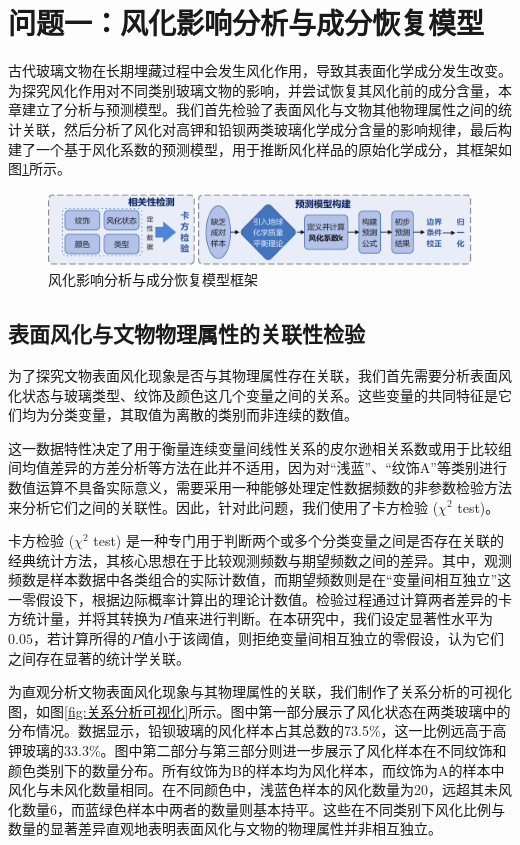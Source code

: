 \section{问题一：风化影响分析与成分恢复模型}

古代玻璃文物在长期埋藏过程中会发生风化作用，导致其表面化学成分发生改变。为探究风化作用对不同类别玻璃文物的影响，并尝试恢复其风化前的成分含量，本章建立了分析与预测模型。我们首先检验了表面风化与文物其他物理属性之间的统计关联，然后分析了风化对高钾和铅钡两类玻璃化学成分含量的影响规律，最后构建了一个基于风化系数的预测模型，用于推断风化样品的原始化学成分，其框架如图\ref{fig:问题一模型框架}所示。

\begin{figure}[H]
	\centering
	\includegraphics[width=\textwidth]{figs/3问题一/第一问框架.pdf}
	\caption{风化影响分析与成分恢复模型框架}
	\label{fig:问题一模型框架}
\end{figure}

\subsection{表面风化与文物物理属性的关联性检验}

为了探究文物表面风化现象是否与其物理属性存在关联，我们首先需要分析表面风化状态与玻璃类型、纹饰及颜色这几个变量之间的关系。这些变量的共同特征是它们均为分类变量，其取值为离散的类别而非连续的数值。

这一数据特性决定了用于衡量连续变量间线性关系的皮尔逊相关系数或用于比较组间均值差异的方差分析等方法在此并不适用，因为对“浅蓝”、“纹饰A”等类别进行数值运算不具备实际意义，需要采用一种能够处理定性数据频数的非参数检验方法来分析它们之间的关联性。因此，针对此问题，我们使用了卡方检验 ($\chi^{2}$ test)。

卡方检验 ($\chi^{2}$ test) 是一种专门用于判断两个或多个分类变量之间是否存在关联的经典统计方法，其核心思想在于比较观测频数与期望频数之间的差异。其中，观测频数是样本数据中各类组合的实际计数值，而期望频数则是在“变量间相互独立”这一零假设下，根据边际概率计算出的理论计数值。检验过程通过计算两者差异的卡方统计量，并将其转换为$P$值来进行判断。在本研究中，我们设定显著性水平为$0.05$，若计算所得的$P$值小于该阈值，则拒绝变量间相互独立的零假设，认为它们之间存在显著的统计学关联。

为直观分析文物表面风化现象与其物理属性的关联，我们制作了关系分析的可视化图，如图\ref{fig:关系分析可视化}所示。图中第一部分展示了风化状态在两类玻璃中的分布情况。数据显示，铅钡玻璃的风化样本占其总数的73.5\%，这一比例远高于高钾玻璃的33.3\%。图中第二部分与第三部分则进一步展示了风化样本在不同纹饰和颜色类别下的数量分布。所有纹饰为B的样本均为风化样本，而纹饰为A的样本中风化与未风化数量相同。在不同颜色中，浅蓝色样本的风化数量为20，远超其未风化数量6，而蓝绿色样本中两者的数量则基本持平。这些在不同类别下风化比例与数量的显著差异直观地表明表面风化与文物的物理属性并非相互独立。





